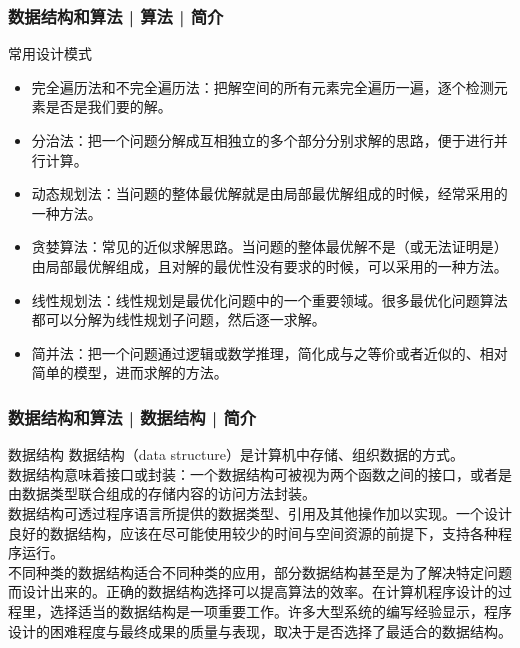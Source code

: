 \begin{frame}
  \frametitle{数据结构和算法 | 算法 | 简介}
  \begin{block}{常用设计模式}
    \begin{itemize}
      \item 完全遍历法和不完全遍历法：把解空间的所有元素完全遍历一遍，逐个检测元素是否是我们要的解。
      \item 分治法：把一个问题分解成互相独立的多个部分分别求解的思路，便于进行并行计算。
      \item 动态规划法：当问题的整体最优解就是由局部最优解组成的时候，经常采用的一种方法。
      \item 贪婪算法：常见的近似求解思路。当问题的整体最优解不是（或无法证明是）由局部最优解组成，且对解的最优性没有要求的时候，可以采用的一种方法。
      \item 线性规划法：线性规划是最优化问题中的一个重要领域。很多最优化问题算法都可以分解为线性规划子问题，然后逐一求解。
      \item 简并法：把一个问题通过逻辑或数学推理，简化成与之等价或者近似的、相对简单的模型，进而求解的方法。
    \end{itemize}
  \end{block}
\end{frame}

\begin{frame}
  \frametitle{数据结构和算法 | 数据结构 | 简介}
  \begin{block}{数据结构}
    数据结构（data structure）是计算机中存储、组织数据的方式。\\
    \vspace{0.5em}
数据结构意味着接口或封装：一个数据结构可被视为两个函数之间的接口，或者是由数据类型联合组成的存储内容的访问方法封装。\\
    \vspace{0.5em}
数据结构可透过程序语言所提供的数据类型、引用及其他操作加以实现。一个设计良好的数据结构，应该在尽可能使用较少的时间与空间资源的前提下，支持各种程序运行。\\
    \vspace{0.5em}
不同种类的数据结构适合不同种类的应用，部分数据结构甚至是为了解决特定问题而设计出来的。\alert{正确的数据结构选择可以提高算法的效率。}在计算机程序设计的过程里，选择适当的数据结构是一项重要工作。许多大型系统的编写经验显示，程序设计的困难程度与最终成果的质量与表现，取决于是否选择了最适合的数据结构。
  \end{block}
\end{frame}

